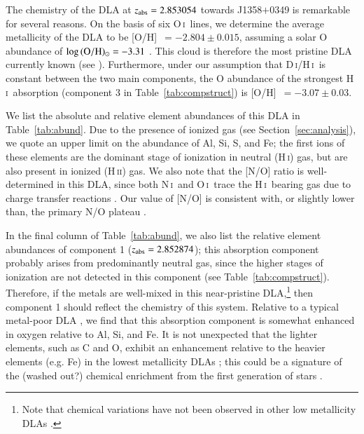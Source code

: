 \documentclass[12pt,preprint,useAMS,usenatbib]{emulateapj}
\newcommand{\DI}{\textrm{D}\,\textsc{i}}
\newcommand{\HI}{\textrm{H}\,\textsc{i}}
\newcommand{\HII}{\textrm{H}\,\textsc{ii}}
\newcommand{\NI}{N\,\textsc{i}}
\newcommand{\OI}{O\,\textsc{i}}
\begin{document}
The chemistry of the DLA at $z_{\rm abs}=2.853054$ towards J1358$+$0349 is
remarkable for several reasons. On the basis of six \OI\ lines, we
determine the average metallicity of the DLA to be [O/H]~$= -2.804\pm0.015$,
assuming a solar O abundance of $\log\,({\rm O/H})_{\odot}=-3.31$ \citep{Asp09}.
This cloud is therefore the most pristine DLA currently known (see \citealt{Coo11b}).
Furthermore, under our assumption that \DI/\HI\ is constant between the two main components,
the O abundance of the strongest \HI\ absorption (component 3 in Table~\ref{tab:compstruct})
is [O/H]~$= -3.07\pm0.03$.

We list the absolute and relative element abundances of this DLA in Table~\ref{tab:abund}.
Due to the presence of ionized gas (see Section~\ref{sec:analysis}), we quote an upper limit
on the abundance of Al, Si, S, and Fe; the first ions of these elements are the dominant stage of ionization in neutral (\HI) gas, but are also present in ionized (\HII) gas.
We also note that the [N/O] ratio
is well-determined in this DLA, since both \NI\ and \OI\ trace the \HI\ bearing gas due to
charge transfer reactions \citep{FieSte71,SteWerGel71}. Our value of [N/O] is consistent
with, or slightly lower than, the primary N/O plateau \citep{IzoThu99,Cen03,vZHay06,Pet08,PetLedSri08,PetCoo12b,Zaf14}.

In the final column of Table~\ref{tab:abund},
we also list the relative element abundances of component 1 ($z_{\rm abs}=2.852874$);
this absorption component probably arises from predominantly neutral gas, since
the higher stages of ionization are not detected in this component (see Table~\ref{tab:compstruct}).
Therefore, if the metals are well-mixed in this near-pristine DLA,\footnote{Note that chemical
variations have not been observed in other low metallicity DLAs \citep{Pro03,Coo11b}.} then
component 1 should reflect the chemistry of this system.
Relative to a typical metal-poor DLA \citep{Coo11b}, we find that this absorption component is somewhat
enhanced in oxygen relative to Al, Si, and Fe. It is not unexpected that the lighter elements,
such as C and O, exhibit an enhancement relative to the heavier elements (e.g. Fe) in
the lowest metallicity DLAs \citep{Coo11a,CooMad14}; this could be a signature of the
(washed out?) chemical enrichment from the first generation of stars \citep[e.g.][]{UmeNom03}.
\end{document}
